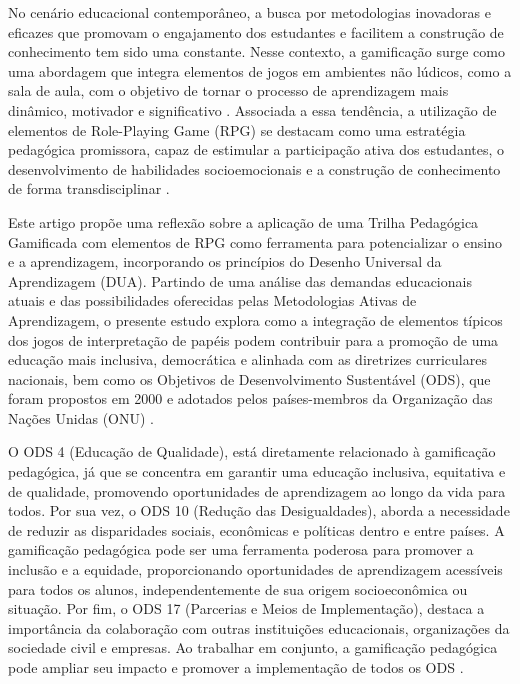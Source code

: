 No cenário educacional contemporâneo, a busca por metodologias inovadoras e eficazes que promovam o engajamento dos estudantes e facilitem a construção de conhecimento tem sido uma constante. Nesse contexto, a gamificação surge como uma abordagem que integra elementos de jogos em ambientes não lúdicos, como a sala de aula, com o objetivo de tornar o processo de aprendizagem mais dinâmico, motivador e significativo \textcite{seaborn2015gamification}. Associada a essa tendência, a utilização de elementos de Role-Playing Game (RPG) se destacam como uma estratégia pedagógica promissora, capaz de estimular a participação ativa dos estudantes, o desenvolvimento de habilidades socioemocionais e a construção de conhecimento de forma transdisciplinar \textcite{hamari2014does}.

Este artigo propõe uma reflexão sobre a aplicação de uma Trilha Pedagógica Gamificada com elementos de RPG como ferramenta para potencializar o ensino e a aprendizagem, incorporando os princípios do Desenho Universal da Aprendizagem (DUA). Partindo de uma análise das demandas educacionais atuais e das possibilidades oferecidas pelas Metodologias Ativas de Aprendizagem, o presente estudo explora como a integração de elementos típicos dos jogos de interpretação de papéis podem contribuir para a promoção de uma educação mais inclusiva, democrática e alinhada com as diretrizes curriculares nacionais, bem como os Objetivos de Desenvolvimento Sustentável (ODS), que foram propostos em 2000 e adotados pelos países-membros da Organização das Nações Unidas (ONU) \textcite{de2022game}.

O ODS 4 (Educação de Qualidade), está diretamente relacionado à gamificação pedagógica, já que se concentra em garantir uma educação inclusiva, equitativa e de qualidade, promovendo oportunidades de aprendizagem ao longo da vida para todos. Por sua vez, o ODS 10 (Redução das Desigualdades), aborda a necessidade de reduzir as disparidades sociais, econômicas e políticas dentro e entre países. A gamificação pedagógica pode ser uma ferramenta poderosa para promover a inclusão e a equidade, proporcionando oportunidades de aprendizagem acessíveis para todos os alunos, independentemente de sua origem socioeconômica ou situação. Por fim, o ODS 17 (Parcerias e Meios de Implementação), destaca a importância da colaboração com outras instituições educacionais, organizações da sociedade civil e empresas. Ao trabalhar em conjunto, a gamificação pedagógica pode ampliar seu impacto e promover a implementação de todos os ODS \textcite{hamari2014does}.

